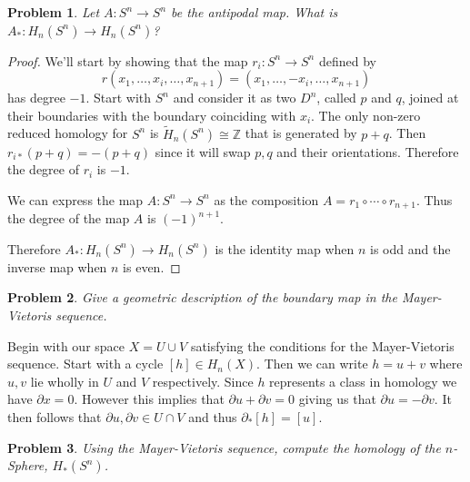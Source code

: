 \documentclass[10pt]{article}
\newcommand{\sk}{\vskip 10mm}
\newcommand{\bb}[1]{\mathbb{#1}}
\newcommand{\wt}[1]{\widetilde{#1}}
\theoremstyle{plain}
\newtheorem{problem}{Problem}
\theoremstyle{remark}
\begin{document}
\sk

\begin{problem}
  Let $A: S^n \to S^n$ be the antipodal map. What is $A_\ast : H_n(S^n) \to H_n(S^n)$?
\end{problem}

\begin{proof}
  We'll start by showing that the map $r_i:S^n\rightarrow S^n$ defined by
  \[ r(x_1,\ldots,x_i,\ldots,x_{n+1})=(x_1,\ldots,-x_i,\ldots,x_{n+1})\]
  has degree $-1$. Start with $S^n$ and consider it as two $D^n$, called $p$ and $q$,
  joined at their boundaries with the boundary coinciding with $x_i$.
  The only non-zero reduced homology for $S^n$
  is $\wt{H}_n(S^n)\cong\bb{Z}$ that is generated by $p+q$. Then $r_{i*}(p+q)=-(p+q)$
  since it will swap $p,q$ and their orientations. Therefore the degree of $r_i$
  is $-1$.

  We can express the map $A:S^n\rightarrow S^n$ as the composition $A=r_1\circ\cdots\circ r_{n+1}$. Thus the
  degree of the map $A$ is $(-1)^{n+1}$.

  Therefore $A_*:H_n(S^n)\rightarrow H_n(S^n)$ is the identity map when $n$ is odd and the
  inverse map when $n$ is even.
\end{proof}

\sk

\begin{problem}
  Give a geometric description of the boundary map in the Mayer-Vietoris sequence.
\end{problem}

Begin with our space $X=U\cup V$ satisfying the conditions for the Mayer-Vietoris
sequence. Start with a cycle $[h]\in H_n(X)$. Then we can write $h=u+v$ where $u,v$
lie wholly in $U$ and $V$ respectively. Since $h$ represents a class in homology
we have $\partial x = 0$. However this implies that $\partial u+\partial v = 0$ giving us that
$\partial u = -\partial v$. It then follows that $\partial u,\partial v\in U\cap V$ and thus $\partial_*[h]=[u]$.

\sk

\begin{problem}
  Using the Mayer-Vietoris sequence, compute the homology of the $n$-Sphere, $H_\ast (S^n)$.
\end{problem}
\end{document}
